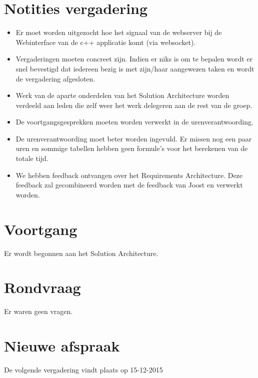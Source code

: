 \documentclass[dutch]{hu}
\begin{document}
\section{Notities vergadering}
\begin{itemize}

\item Er moet worden uitgezocht hoe het signaal van de webserver bij de Webinterface van de c++ applicatie komt (via websocket).
\item Vergaderingen moeten concreet zijn. Indien er niks is om te bepalen wordt er snel bevestigd dat iedereen bezig is met zijn/haar aangewezen taken en wordt de vergadering afgesloten.
\item Werk van de aparte onderdelen van het Solution Architecture worden verdeeld aan leden die zelf weer het werk delegeren aan de rest van de groep.
\item De voortgangsgesprekken moeten worden verwerkt in de urenverantwoording.
\item De urenverantwoording moet beter worden ingevuld. Er missen nog een paar uren en sommige tabellen hebben geen formule's voor het berekenen van de totale tijd.
\item We hebben feedback ontvangen over het Requirements Architecture. Deze feedback zal gecombineerd worden met de feedback van Joost en verwerkt worden.

\end{itemize}

\section{Voortgang}
Er wordt begonnen aan het Solution Architecture.

\section{Rondvraag}
Er waren geen vragen.

\section{Nieuwe afspraak}
De volgende vergadering vindt plaats op 15-12-2015
\end{document}
